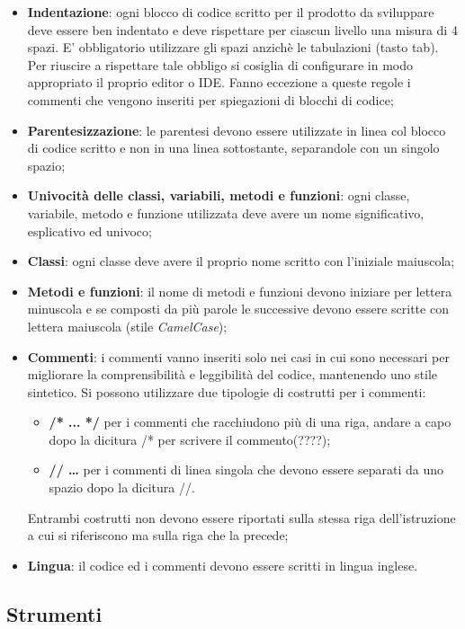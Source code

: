 \begin{itemize}
	\item \textbf{Indentazione}: ogni blocco di codice scritto per il prodotto da sviluppare deve essere ben indentato e deve rispettare per ciascun livello una misura di 4 spazi. E’ obbligatorio utilizzare gli spazi anzichè le tabulazioni (tasto tab). Per riuscire a rispettare tale obbligo si cosiglia di configurare in modo appropriato il proprio editor o IDE. Fanno eccezione a queste regole i commenti che vengono inseriti per spiegazioni di blocchi di codice;
	\item \textbf{Parentesizzazione}:  le parentesi devono essere utilizzate in linea col blocco di codice scritto e non in una linea sottostante, separandole con un singolo spazio;
	\item \textbf{Univocità delle classi, variabili, metodi e funzioni}: ogni classe, variabile, metodo e funzione utilizzata deve avere un nome significativo, esplicativo ed univoco;
	\item \textbf{Classi}: ogni classe deve avere il proprio nome scritto con l'iniziale maiuscola;
	\item \textbf{Metodi e funzioni}: il nome di metodi e funzioni devono iniziare per lettera minuscola e se composti da più parole le successive devono essere scritte con lettera maiuscola (stile \textit{CamelCase});
	\item \textbf{Commenti}: i commenti vanno inseriti solo nei casi in cui sono necessari per migliorare la comprensibilità e leggibilità del codice, mantenendo uno stile sintetico. Si possono utilizzare due tipologie di costrutti per i commenti:
	\begin{itemize}
		\item \textbf{/* ... */} per i commenti che racchiudono più di una riga, andare a capo dopo la dicitura /*  per scrivere il commento(????);
		\item \textbf{// … } per i commenti di linea singola che devono essere separati da uno spazio dopo la dicitura //.
	\end{itemize}
	Entrambi costrutti non devono essere riportati sulla stessa riga dell’istruzione a cui si riferiscono ma sulla riga che la precede;
	\item \textbf{Lingua}: il codice ed i commenti devono essere scritti in lingua inglese.
\end{itemize}

\subsection{Strumenti}\label{ProcessiPrimariStrumenti}

